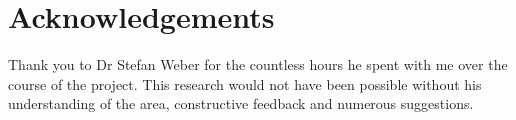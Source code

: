\chapter*{Acknowledgements}
Thank you to Dr Stefan Weber for the countless hours he spent with me over the course of the project. This research would not have been possible without his understanding of the area, constructive feedback and numerous suggestions.
